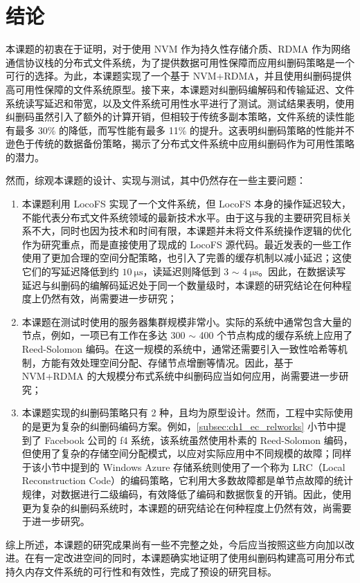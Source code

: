 
\chapter{结论}
\label{cha:conclusion}


本课题的初衷在于证明，对于使用 NVM 作为持久性存储介质、RDMA 作为网络通信协议栈的分布式文件系统，为了提供数据可用性保障而应用纠删码策略是一个可行的选择。为此，本课题实现了一个基于 NVM+RDMA，并且使用纠删码提供高可用性保障的文件系统原型。接下来，本课题对纠删码编解码和传输延迟、文件系统读写延迟和带宽，以及文件系统可用性水平进行了测试。测试结果表明，使用纠删码虽然引入了额外的计算开销，但相较于传统多副本策略，文件系统的读性能有最多 30\% 的降低，而写性能有最多 11\% 的提升。这表明纠删码策略的性能并不逊色于传统的数据备份策略，揭示了分布式文件系统中应用纠删码作为可用性策略的潜力。

然而，综观本课题的设计、实现与测试，其中仍然存在一些主要问题：

\begin{enumerate}[(1)]
    
    \item 本课题利用 LocoFS 实现了一个文件系统，但 LocoFS 本身的操作延迟较大，不能代表分布式文件系统领域的最新技术水平。由于这与我的主要研究目标关系不大，同时也因为技术和时间有限，本课题并未将文件系统操作逻辑的优化作为研究重点，而是直接使用了现成的 LocoFS 源代码。最近发表的一些工作使用了更加合理的空间分配策略\cite{orion2019}，也引入了完善的缓存机制以减小延迟\cite{assise2019}；这使它们的写延迟降低到约 $\SI{10}{\us}$，读延迟则降低到 3 $\sim$ $\SI{4}{\us}$。因此，在数据读写延迟与纠删码的编解码延迟处于同一个数量级时，本课题的研究结论在何种程度上仍然有效，尚需要进一步研究；
    
    \item 本课题在测试时使用的服务器集群规模非常小。实际的系统中通常包含大量的节点，例如，一项已有工作在多达 300 $\sim$ 400 个节点构成的缓存系统上应用了 Reed-Solomon 编码\cite{infinicache2020}。在这一规模的系统中，通常还需要引入一致性哈希等机制，方能有效处理空间分配、存储节点增删等情况。因此，基于 NVM+RDMA 的大规模分布式系统中纠删码应当如何应用，尚需要进一步研究；
    
    \item 本课题实现的纠删码策略只有 2 种，且均为原型设计。然而，工程中实际使用的是更为复杂的纠删码编码方案。例如，\ref{subsec:ch1_ec_relworks} 小节中提到了 Facebook 公司的 f4 系统，该系统虽然使用朴素的 Reed-Solomon 编码，但使用了复杂的存储空间分配模式，以应对实际应用中不同规模的故障；同样于该小节中提到的 Windows Azure 存储系统则使用了一个称为 LRC（Local Reconstruction Code）的编码策略，它利用大多数故障都是单节点故障的统计规律，对数据进行二级编码，有效降低了编码和数据恢复的开销。因此，使用更为复杂的纠删码系统时，本课题的研究结论在何种程度上仍然有效，尚需要于进一步研究。

\end{enumerate}

综上所述，本课题的研究成果尚有一些不完整之处，今后应当按照这些方向加以改进。在有一定改进空间的同时，本课题确实地证明了使用纠删码构建高可用分布式持久内存文件系统的可行性和有效性，完成了预设的研究目标。
